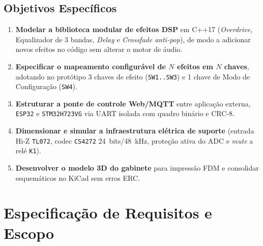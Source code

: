 \documentclass[12pt,openright,oneside,a4paper,brazil]{abntex2}
\begin{document}
\section{Objetivos Específicos}
\begin{enumerate}
  \item \textbf{Modelar a biblioteca modular de efeitos DSP} em C++17 (\textit{Overdrive}, Equalizador de 3 bandas, \textit{Delay} e \textit{Crossfade anti-pop}), de modo a adicionar novos efeitos no código sem alterar o motor de áudio.
  \item \textbf{Especificar o mapeamento configurável de $N$ efeitos em $N$ chaves}, adotando no protótipo 3 chaves de efeito (\texttt{SW1..SW3}) e 1 chave de Modo de Configuração (\texttt{SW4}).
  \item \textbf{Estruturar a ponte de controle Web/MQTT} entre aplicação externa, \texttt{ESP32} e \texttt{STM32H723VG} via UART isolada com quadro binário e CRC-8.
  \item \textbf{Dimensionar e simular a infraestrutura elétrica de suporte} (entrada Hi-Z \texttt{TL072}, codec \texttt{CS4272} 24~bits/48~kHz, proteção ativa do ADC e \textit{mute} a relé \texttt{K1}).
  \item \textbf{Desenvolver o modelo 3D do gabinete} para impressão FDM e consolidar esquemáticos no KiCad sem erros ERC.
\end{enumerate}

\chapter{Especificação de Requisitos e Escopo}
\end{document}
